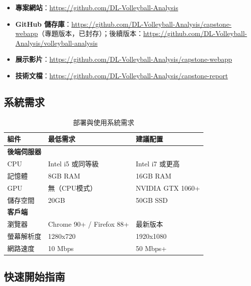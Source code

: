 \documentclass[a4paper,14pt,oneside]{article}
\begin{document}
\begin{itemize}
    \item \textbf{專案網站}：\url{https://github.com/DL-Volleyball-Analysis}
    \item \textbf{GitHub 儲存庫}：\url{https://github.com/DL-Volleyball-Analysis/capstone-webapp}（專題版本，已封存）；後續版本：\url{https://github.com/DL-Volleyball-Analysis/volleyball-analysis}
    \item \textbf{展示影片}：\url{https://github.com/DL-Volleyball-Analysis/capstone-webapp}
    \item \textbf{技術文檔}：\url{https://github.com/DL-Volleyball-Analysis/capstone-report}
\end{itemize}

\subsection*{系統需求}

\begin{table}[H]
    \centering
    \caption{部署與使用系統需求}
    \begin{tabular}{|l|l|l|}
        \hline
        \textbf{組件} & \textbf{最低需求} & \textbf{建議配置} \\
        \hline
        \textbf{後端伺服器} & & \\
        CPU & Intel i5 或同等級 & Intel i7 或更高 \\
        記憶體 & 8GB RAM & 16GB RAM \\
        GPU & 無（CPU模式） & NVIDIA GTX 1060+ \\
        儲存空間 & 20GB & 50GB SSD \\
        \hline
        \textbf{客戶端} & & \\
        瀏覽器 & Chrome 90+ / Firefox 88+ & 最新版本 \\
        螢幕解析度 & 1280x720 & 1920x1080 \\
        網路速度 & 10 Mbps & 50 Mbps+ \\
        \hline
    \end{tabular}
\end{table}

\subsection*{快速開始指南}
\end{document}
